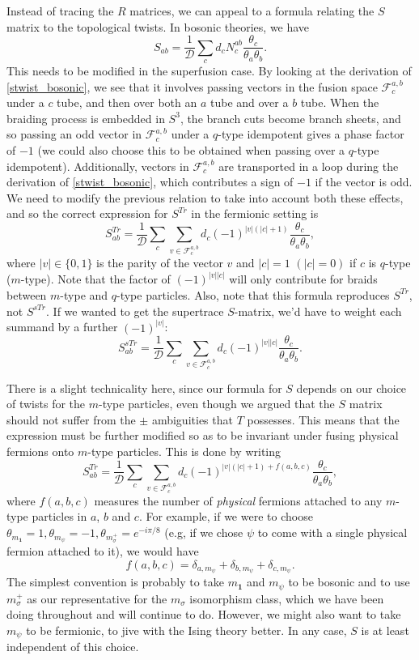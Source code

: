 \documentclass[12pt,a4paper]{article}
\newcommand{\unit}{\mathbf{1}}
\newcommand{\mcd}{\mathcal{D}}
\newcommand\be            {\begin{equation}}
\newcommand\ee            {\end{equation}}
\newcommand{\fld}{\mathcal{F}}
\begin{document}
Instead of tracing the $R$ matrices, we can appeal to a formula relating the $S$ matrix to the topological twists. In bosonic theories, we have 
\be \label{stwist_bosonic} S_{ab} = \frac{1}{\mcd} \sum_c d_c N^{ab}_c \frac{\theta_c}{\theta_a\theta_b}.\ee
This needs to be modified in the superfusion case. By looking at the derivation of \eqref{stwist_bosonic}, we see that it involves passing vectors in the fusion space $\fld^{a,b}_c$ under a $c$ tube, and then over both an $a$ tube and over a $b$ tube. When the braiding process is embedded in $S^3$, the branch cuts become branch sheets, and so passing an odd vector in $\fld^{a,b}_c$ under a $q$-type idempotent gives a phase factor of $-1$ (we could also choose this to be obtained when passing over a $q$-type idempotent). Additionally, vectors in $\fld^{a,b}_c$ are transported in a loop during the derivation of \eqref{stwist_bosonic}, which contributes a sign of $-1$ if the vector is odd. We need to modify the previous relation to take into account both these effects, and so the correct expression for $S^{Tr}$ in the fermionic setting is 
\be S^{Tr}_{ab} = \frac{1}{\mcd} \sum_c \sum_{v \in \fld^{a,b}_c} d_c (-1)^{|v| (|c|+1)}   \frac{\theta_c}{\theta_a\theta_b},\ee
where $|v| \in \{0,1\}$ is the parity of the vector $v$ and $|c| = 1$ $(|c|=0)$ if $c$ is $q$-type ($m$-type). Note that the factor of $(-1)^{|v||c|}$ will only contribute for braids between $m$-type and $q$-type particles. Also, note that this formula reproduces $S^{Tr}$, not $S^{sTr}$. If we wanted to get the supertrace $S$-matrix, we'd have to weight each summand by a further $(-1)^{|v|}$:
\be S^{sTr}_{ab} = \frac{1}{\mcd} \sum_c \sum_{v \in \fld^{a,b}_c} d_c (-1)^{|v| |c|}   \frac{\theta_c}{\theta_a\theta_b}.\ee

There is a slight technicality here, since our formula for $S$ depends on our choice of twists for the $m$-type particles, even though we argued that the $S$ matrix should not suffer from the $\pm$ ambiguities that $T$ possesses. This means that the expression must be further modified so as to be invariant under fusing physical fermions onto $m$-type particles. This is done by writing 
\be S^{Tr}_{ab} = \frac{1}{\mcd} \sum_c \sum_{v \in \fld^{a,b}_c} d_c (-1)^{|v| (|c| + 1) + f(a,b,c)}   \frac{\theta_c}{\theta_a\theta_b},\ee
where $f(a,b,c)$ measures the number of {\it physical} fermions attached to any $m$-type particles in $a$, $b$ and $c$. For example, if we were to choose $\theta_{m_\unit} = 1, \theta_{m_\psi} = -1,\theta_{m^+_\sigma} = e^{-i\pi/8}$ (e.g, if we chose $\psi$ to come with a single physical fermion attached to it), we would have 
\be {f(a,b,c)} = \delta_{a,m_\psi} + \delta_{b,m_\psi} + \delta_{c,m_\psi}.\ee
The simplest convention is probably to take $m_\unit$ and $m_\psi$ to be bosonic and to use $m_\sigma^+$ as our representative for the $m_\sigma$ isomorphism class, which we have been doing throughout and will continue to do. However, we might also want to take $m_\psi$ to be fermionic, to jive with the Ising theory better. In any case, $S$ is at least independent of this choice. 
\end{document}
